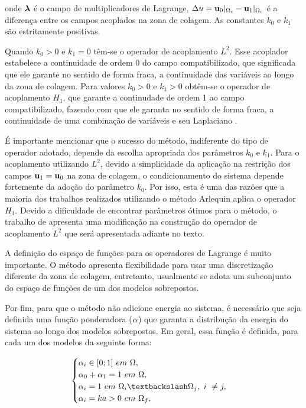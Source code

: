 \documentclass[tese_patricia]{subfiles}
\begin{document}
\noindent onde $\boldsymbol{\lambda}$ é o campo de multiplicadores de Lagrange, $\Delta u = \mathbf{u}_0 |_{\Omega_c} - \mathbf{u}_1 |_{\Omega_c}$ é a diferença entre os campos acoplados na zona de colagem. As constantes $k_{0}$ e $k_{1}$ são estritamente positivas. 

Quando $k_{0} > 0$ e $k_{1} = 0 $ têm-se o operador de acoplamento $L^{2}$. Esse acoplador estabelece a continuidade de ordem 0 do campo compatibilizado, que significada que ele garante no sentido de forma fraca, a continuidade das variáveis ao longo da zona de colagem. Para valores $k_{0} > 0$ e $k_{1} > 0 $ obtêm-se o operador de acoplamento $H_{1}$, que garante a continudade de ordem 1 ao campo compatibilizado, fazendo com que ele garanta no sentido de forma fraca, a continuidade de uma combinação de variáveis e seu Laplaciano \cite{GuidaultAndBelytschko2007}.

É importante mencionar que o sucesso do método, indiferente do tipo de operador adotado, depende da escolha apropriada dos parâmetros $k_{0}$ e $k_{1}$. Para o acoplamento utilizando $L^{2}$, devido a simplicidade da aplicação na restrição dos campos $\mathbf{u}_1 = \mathbf{u}_0$ na zona de colagem, o condicionamento do sistema depende fortemente da adoção do parâmetro $k_{0}$. Por isso, esta é uma das razões que a maioria dos trabalhos realizados utilizando o método Arlequin aplica o operador $H_{1}$. Devido a dificuldade de encontrar parâmetros ótimos para o método, o trabalho de  apresenta uma modificação na construção do operador de acoplamento $L^{2}$ que será apresentada adiante no texto.

A definição do espaço de funções para os operadores de Lagrange é muito importante. O método apresenta flexibilidade para usar uma discretização diferente da zona de colagem, entretanto, usualmente se adota um subconjunto do espaço de funções de um dos modelos sobrepostos.  

Por fim, para que o método não adicione energia ao sistema, é necessário que seja definida uma função ponderadora ($\alpha$) que garanta a distribução da energia do sistema ao longo dos modelos sobrepostos. Em geral, essa função é definida, para cada um dos modelos da seguinte forma:

\begin{align}
\begin{cases} \arlequinWF_{i} \in [0;1] \ em \ \Omega, \\ \arlequinWFGlobal + \arlequinWFLocal = 1 \ em \ \Omega ,\\
\arlequinWF_{i} = 1 \ em \ \Omega_{i} \textbackslash \Omega_{j},  \ i \ \neq j, \\
\arlequinWF_{i}  = ka > 0 \ em \ \Omega_{f}, 
   \end{cases} \label{alphai}
\end{align}
\end{document}
